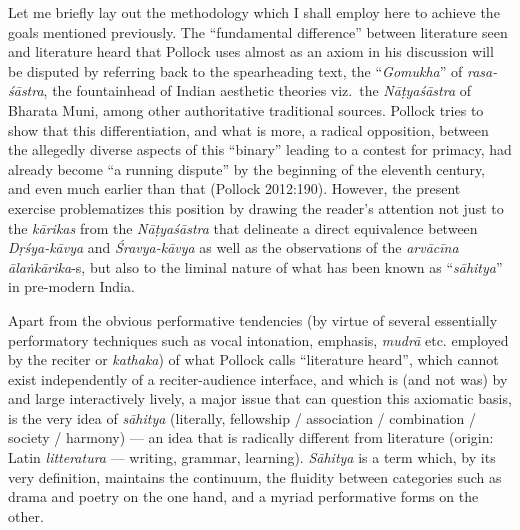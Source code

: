 Let me briefly lay out the methodology which I shall employ here to achieve the goals mentioned previously. The “fundamental difference” between literature seen and literature heard that Pollock uses almost as an axiom in his discussion will be disputed by referring back to the spearheading text, the “\textsl{Gomukha}” of \textsl{rasa-śāstra}, the fountainhead of Indian aesthetic theories viz.~the \textsl{Nāṭyaśāstra} of Bharata Muni, among other authoritative traditional sources. Pollock tries to show that this differentiation, and what is more, a radical opposition, between the allegedly diverse aspects of this “binary” leading to a contest for primacy, had already become “a running dispute” by the beginning of the eleventh century, and even much earlier than that (Pollock 2012:190). However, the present exercise problematizes this position by drawing the reader’s attention not just to the \textsl{kārikas} from the \textsl{Nāṭyaśāstra} that delineate a direct equivalence between \textsl{Dṛśya-kāvya} and \textsl{Śravya-kāvya} as well as the observations of the \textsl{arvācīna ālaṅkārika}-s, but also to the liminal nature of what has been known as “\textsl{sāhitya}” in pre-modern India.

Apart from the obvious performative tendencies (by virtue of several essentially performatory techniques such as vocal intonation, emphasis, \textsl{mudrā} etc. employed by the reciter or \textsl{kathaka}) of what Pollock calls “literature heard”, which cannot exist independently of a reciter-audience interface, and which is (and not was) by and large interactively lively, a major issue that can question this axiomatic basis, is the very idea of \textsl{sāhitya} (literally, fellowship / association / combination / society / harmony) --- an idea that is radically different from literature (origin: Latin \textsl{litteratura} --- writing, grammar, learning). \textsl{Sāhitya} is a term which, by its very definition, maintains the continuum, the fluidity between categories such as drama and poetry on the one hand, and a myriad performative forms on the other. 

